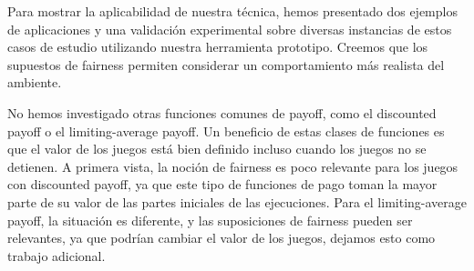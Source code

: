  Para mostrar la aplicabilidad de nuestra técnica, hemos presentado dos ejemplos de aplicaciones y una validación experimental sobre diversas instancias de estos casos de estudio utilizando nuestra herramienta prototipo. Creemos que los supuestos de fairness permiten considerar un comportamiento más realista del ambiente.

No hemos investigado otras funciones comunes de payoff, como el discounted payoff o el limiting-average payoff. Un beneficio de estas clases de funciones es que el valor de los juegos está bien definido incluso cuando los juegos no se detienen.
A primera vista, la noción de fairness es poco relevante para los juegos con discounted payoff, ya que este tipo de funciones de pago toman la mayor parte de su valor de las partes iniciales de las ejecuciones. Para el limiting-average payoff, la situación es diferente, y las suposiciones de fairness pueden ser relevantes, ya que podrían cambiar el valor de los juegos, dejamos esto como trabajo adicional.